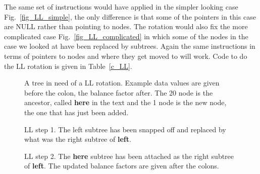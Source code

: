 \documentclass[11pt,a4paper]{scrartcl}
\begin{document}
The same set of instructions would have applied in the simpler looking
case Fig.~\ref{fig_LL_simple}, the only difference is that some of the
pointers in this case are NULL rather than pointing to nodes. The
rotation would also fix the more complicated case
Fig.~\ref{fig_LL_complicated} in which some of the nodes in the case
we looked at have been replaced by subtrees. Again the same instructions in
terms of pointers to nodes and where they get moved to will work. Code
to do the LL rotation is given in Table~\ref{c_LL}.

\begin{figure}
\begin{center}
\end{center}
\caption{A tree in need of a LL rotation. Example data values are
  given before the colon, the balance factor after. The 20 node is the
  ancestor, called {\bf here} in the text and the 1 node is the new
  node, the one that has just been added.\label{fig_LL}}
\end{figure}

\begin{figure}
\begin{center}
\end{center}
\caption{LL step 1. The left subtree has been snapped off and replaced by what
  was the right subtree of {\bf left}.\label{fig_LL_1}}
\end{figure}

\begin{figure}
\begin{center}
\end{center}
\caption{LL step 2. The {\bf here} subtree has been attached as the
  right subtree of {\bf left}. The updated balance factors are given
  after the colons.\label{fig_LL_2}}
\end{figure}
\end{document}
